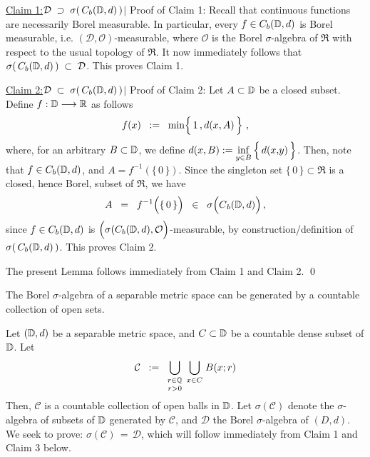 \vskip 0.5cm
\noindent
\underline{Claim 1:\;\;$\mathcal{D} \;\supset\; \sigma\!\left(\,C_{b}(\mathbb{D},d)\,\right)${\color{white}$\vert$}}
\vskip 0.2cm
\noindent
Proof of Claim 1:\;\; Recall that continuous functions are necessarily Borel measurable.
In particular, every $f \in C_{b}(\mathbb{D},d)$ is Borel measurable, i.e. $(\mathcal{D},\mathcal{O})$-measurable,
where $\mathcal{O}$ is the Borel $\sigma$-algebra of $\Re$ with respect to the usual topology of $\Re$.
It now immediately follows that $\sigma\!\left(\,C_{b}(\mathbb{D},d)\,\right) \;\subset\; \mathcal{D}$.
This proves Claim 1.

\vskip 0.5cm
\noindent
\underline{Claim 2:\;\;$\mathcal{D} \;\subset\; \sigma\!\left(\,C_{b}(\mathbb{D},d)\,\right)${\color{white}$\vert$}}
\vskip 0.2cm
\noindent
Proof of Claim 2:\;\; Let $A \subset \mathbb{D}$ be a closed subset.
Define $f : \mathbb{D} \longrightarrow \mathbb{R}$ as follows
\begin{equation*}
f(x) \;\; := \;\; \min\!\left\{\,1\,\overset{{\color{white}\vert}}{,}\,d(x,A)\,\right\}\,,
\end{equation*}
where, for an arbitrary $B\subset\mathbb{D}$, we define
$d(x,B) := \underset{y \in B}{\inf}\left\{\,d(x\overset{{\color{white}\vert}}{,}y)\,\right\}$.
Then, note that $f \in C_{b}(\mathbb{D},d)$, and $A = f^{-1}(\{\,0\,\})$.
Since the singleton set $\{\,0\,\} \subset \Re$ is a closed, hence Borel, subset of $\Re$, we have
\begin{equation*}
A \;\; = \;\; f^{-1}\!\left(\{\,\overset{{\color{white}.}}{0}\,\}\right)
	\;\; \in \;\; \sigma\!\left(\overset{{\color{white}.}}{C}_{b}(\D,d)\right),
\end{equation*}
since $f \in C_{b}(\mathbb{D},d)$ is
$\left(\overset{{\color{white}-}}{\sigma}(C_{b}(\D,d),\mathcal{O}\right)$-measurable,
by construction/definition of $\sigma\!\left(\,C_{b}(\mathbb{D},d)\,\right)$.
This proves Claim 2.

\vskip 0.5cm
\noindent
The present Lemma follows immediately from Claim 1 and Claim 2.
\qed


\begin{lemma}
\mbox{}\vskip 0.1cm
\noindent
The Borel $\sigma$-algebra of a separable metric space can be generated by
a countable collection of open sets.
\end{lemma}
\proof
Let $(\mathbb{D},d)$ be a separable metric space, and $C \subset \mathbb{D}$ be a countable dense subset of $\mathbb{D}$.
Let
\begin{equation*}
\mathcal{C}
\;\; := \;\;
	\underset{r>0}{\underset{r\in\mathbb{Q}}{\bigcup}}\;\,
	\underset{x \in C}{\bigcup}\;
	B(x;r)
\end{equation*}
Then, $\mathcal{C}$ is a countable collection of open balls in $\mathbb{D}$.
Let $\sigma(\mathcal{C})$ denote the $\sigma$-algebra of subsets of $\mathbb{D}$ generated by $\mathcal{C}$,
and $\mathcal{D}$ the Borel $\sigma$-algebra of $(D,d)$.
We seek to prove: $\sigma(\mathcal{C}) \,=\, \mathcal{D}$, which will follow immediately from
Claim 1 and Claim 3 below.

